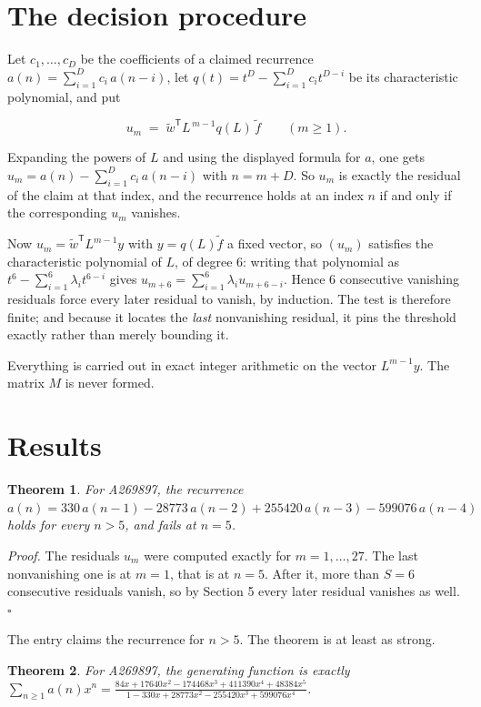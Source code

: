 \documentclass[11pt]{article}
\newtheorem{theorem}{Theorem}
\theoremstyle{definition}
\begin{document}
\section{The decision procedure}

Let $c_1,\dots,c_D$ be the coefficients of a claimed recurrence $a(n) = \sum_{i=1}^{D} c_i\,a(n-i)$, let $q(t) = t^{D} - \sum_{i=1}^{D} c_i t^{D-i}$ be its characteristic polynomial, and put

\[u_m \;=\; \tilde w^{\mathsf T} L^{\,m-1} q(L)\,\tilde f \qquad (m \ge 1).\]

Expanding the powers of $L$ and using the displayed formula for $a$, one gets $u_m = a(n) - \sum_{i=1}^{D} c_i\,a(n-i)$ with $n = m + D$. So $u_m$ is exactly the residual of the claim at that index, and the recurrence holds at an index $n$ if and only if the corresponding $u_m$ vanishes.

Now $u_m = \tilde w^{\mathsf T} L^{m-1} y$ with $y = q(L)\tilde f$ a fixed vector, so $(u_m)$ satisfies the characteristic polynomial of $L$, of degree $6$: writing that polynomial as $t^{6} - \sum_{i=1}^{6} \lambda_i t^{6-i}$ gives $u_{m+6} = \sum_{i=1}^{6} \lambda_i u_{m+6-i}$. Hence $6$ consecutive vanishing residuals force every later residual to vanish, by induction. The test is therefore finite; and because it locates the {\itshape last} nonvanishing residual, it pins the threshold exactly rather than merely bounding it.

Everything is carried out in exact integer arithmetic on the vector $L^{m-1}y$. The matrix $M$ is never formed.

\section{Results}

\begin{theorem} For A269897, the recurrence $a(n) = 330\,a(n-1) - 28773\,a(n-2) + 255420\,a(n-3) - 599076\,a(n-4)$ holds for every $n > 5$, and fails at $n = 5$.\end{theorem}

{\itshape Proof.} The residuals $u_m$ were computed exactly for $m = 1,\dots,27$. The last nonvanishing one is at $m = 1$, that is at $n = 5$. After it, more than $S = 6$ consecutive residuals vanish, so by Section 5 every later residual vanishes as well. $\square$

The entry claims the recurrence for $n > 5$. The theorem is at least as strong.

\begin{theorem} For A269897, the generating function is exactly $\sum_{n\ge 1} a(n)x^n = \frac{84x + 17640x^{2} - 174468x^{3} + 411390x^{4} + 48384x^{5}}{1 - 330x + 28773x^{2} - 255420x^{3} + 599076x^{4}}$.\end{theorem}
\end{document}
